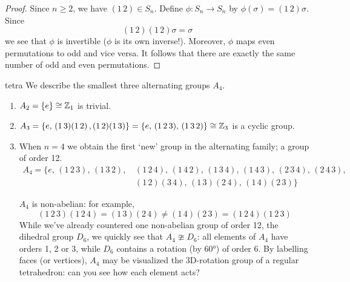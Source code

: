 \begin{proof}
	Since $n\ge 2$, we have $(1\,2)\in S_n$. Define $\phi:S_n\to S_n$ by $\phi(\sigma)=(1\,2)\sigma$. Since
	\[
		(1\,2)(1\,2)\sigma=\sigma
	\]
	we see that $\phi$ is invertible ($\phi$ is its own inverse!). Moreover, $\phi$ maps even permutations to odd and vice versa. It follows that there are exactly the same number of odd and even permutations.
\end{proof}

\begin{examples}{}{tetra}
	We describe the smallest three alternating groups $A_4$.
	\begin{enumerate}
	  \item $A_2=\{e\}\cong \mathbb{Z}_1$ is trivial.
	  \item $A_3=\{e,\,(1\,3)(1\,2)\,,(1\,2)(1\,3)\}=\{e,\,(1\,2\,3),\,(1\,3\,2)\}\cong\mathbb{Z}_3$ is a cyclic group.
	  \item\label{ex:tetra2} When $n=4$ we obtain the first `new' group in the alternating family; a group of order 12.
	  \begin{align*}
	  	A_4=\{e,\,(1\,2\,3),\,(1\,3\,2),\,&(1\,2\,4),\,(1\,4\,2),\,(1\,3\,4),\,(1\,4\,3),\,(2\,3\,4),\,(2\,4\,3),\\
	  	&(1\,2)(3\,4),\,(1\,3)(2\,4),\,(1\,4)(2\,3)\}
	  \end{align*}
	  \begin{minipage}[t]{0.69\linewidth}\vspace{0pt}
	    $A_4$ is non-abelian: for example,
	  	\[
	  		(1\,2\,3)(1\,2\,4)=(1\,3)(2\,4)\neq (1\,4)(2\,3)=(1\,2\,4)(1\,2\,3)
	  	\]
	  	While we've already countered one non-abelian group of order 12, the dihedral group $D_6$, we quickly see that $A_4\ncong D_6$: all elements of $A_4$ have orders 1, 2 or 3, while $D_6$ contains a rotation (by $\ang{60}$) of order 6.\smallbreak
	  By labelling faces (or vertices), $A_4$ may be visualized the 3D-rotation group of a regular tetrahedron: can you see how each element acts?
	  \end{minipage}
	  \hfill
	  \begin{minipage}[t]{0.3\linewidth}\vspace{0pt}

\end{minipage}
\end{enumerate}
\end{examples}
